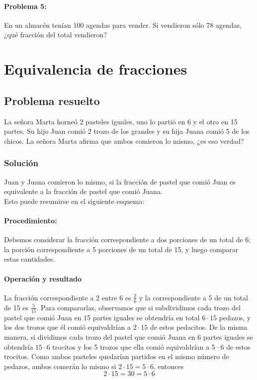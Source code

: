 \documentclass[10pt,twoside]{article}
\begin{document}
\paragraph*{Problema 5:} En un almacén tenían 100 agendas para vender. Si vendieron sólo 78 agendas, ¿qué fracción
del total vendieron?
\section*{Equivalencia de fracciones}
\subsection*{Problema resuelto}
La señora Marta horneó 2 pasteles iguales, uno lo partió en 6 y el otro en 15 partes. Su hijo Juan comió 2 trozo de los grandes y su hija Juana comió 5 de los chicos. La señora Marta afirma que ambos comieron lo mismo, ¿es eso verdad?
\subsubsection*{Soluci\'{o}n}
Juan y Juana comieron lo mismo, si la fracción de pastel que comió Juan es equivalente a la fracción de pastel que comió Juana.\\
Esto puede resumirse en el siguiente esquema:
\paragraph*{Procedimiento:} Debemos considerar la fracción correspondiente a dos porciones de un total de 6; la porción correspondiente a 5 porciones de un total de 15, y luego comparar estas cantidades.
\paragraph*{Operación y resultado}
La fracción correspondiente a 2 entre 6 es $\frac{2}{6}$ y la correspondiente a 5 de un total de 15 es $\frac{5}{15}$. Para compararlas, observamos que si subdividimos cada trozo
del pastel que comió Juan en 15 partes iguales se obtendría en total $6\cdot 15$ pedazos, y los dos trozos que él comió
equivaldrían a $2\cdot 15$ de estos pedacitos. De la misma
manera, si dividimos cada trozo del pastel que comió Juana en 6 partes iguales se obtendría $15\cdot 6$ trocitos y los 5 trozos que ella comió equivaldrían a 5·6 de estos
trocitos. Como ambos pasteles quedarían partidos en el
mismo número de pedazos, ambos comerán lo mismo si $2\cdot 15 = 5\cdot 6$, entonces \[2\cdot 15=30= 5\cdot6\]
\end{document}

